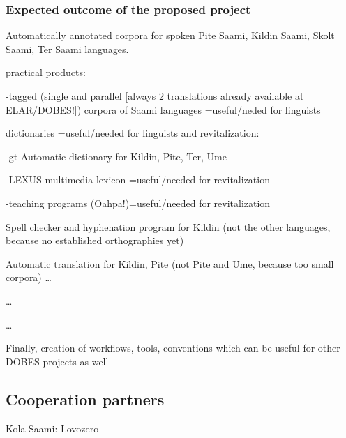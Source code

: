 \documentclass[a4paper,12pt]{article}
\begin{document}
\subsubsection{Expected outcome of the proposed project}
Automatically annotated corpora for spoken Pite Saami, Kildin Saami, Skolt Saami, Ter Saami languages.

practical products:

-tagged (single and parallel [always 2 translations already available at ELAR/DOBES!]) corpora of Saami languages =useful/neded for linguists

dictionaries =useful/needed for linguists and revitalization:

-gt-Automatic dictionary for Kildin, Pite, Ter, Ume

-LEXUS-multimedia lexicon =useful/needed for revitalization

-teaching programs (Oahpa!)=useful/needed for revitalization

Spell checker and hyphenation program for Kildin (not the other languages, because no established orthographies yet)

Automatic translation for Kildin, Pite (not Pite and Ume, because too small corpora)
…

…

…

Finally, creation of workflows, tools, conventions which can be useful for other DOBES projects as well


\subsection{Cooperation partners}
Kola Saami: Lovozero
\end{document}

